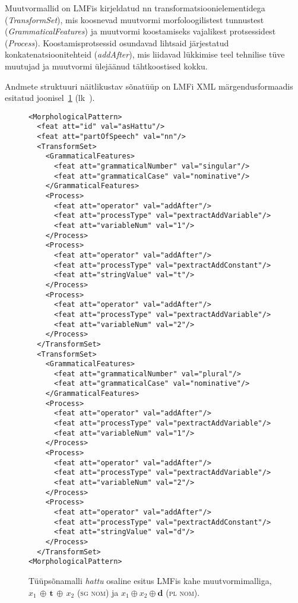 \documentclass[12pt,a4paper]{article}
\newcommand{\vadja}[1]{\textit{#1}}
\newcommand{\msd}[1]{\textsc{#1}}
\begin{document}
Muutvormallid on LMFis kirjeldatud nn transformatsiooni\-elementidega (\textit{TransformSet}), mis koosnevad muutvormi morfoloogilistest tunnustest (\textit{GrammaticalFeatures}) ja muutvormi koostamiseks vajalikest protsessidest (\textit{Process}). Koostamis\-protsessid osundavad lihtsaid järjestatud konkatenatsiooni\-tehteid (\textit{addAfter}), mis liidavad lükkimise teel tehnilise tüve muutujad ja muutvormi ülejäänud tähtkoostised kokku.

Andmete struktuuri näitlikustav sõnatüüp on LMFi XML märgendus\-formaadis esitatud joonisel~\ref{code:lmf-paradigmpattern} (lk~\pageref{code:lmf-paradigmpattern}).

\begin{figure}[h]
  \center
\begin{verbatim}
<MorphologicalPattern>
  <feat att="id" val="asHattu"/>
  <feat att="partOfSpeech" val="nn"/>
  <TransformSet>
    <GrammaticalFeatures>
      <feat att="grammaticalNumber" val="singular"/>
      <feat att="grammaticalCase" val="nominative"/>
    </GrammaticalFeatures>
    <Process>
      <feat att="operator" val="addAfter"/>
      <feat att="processType" val="pextractAddVariable"/>
      <feat att="variableNum" val="1"/>
    </Process>
    <Process>
      <feat att="operator" val="addAfter"/>
      <feat att="processType" val="pextractAddConstant"/>
      <feat att="stringValue" val="t"/>
    </Process>
    <Process>
      <feat att="operator" val="addAfter"/>
      <feat att="processType" val="pextractAddVariable"/>
      <feat att="variableNum" val="2"/>
    </Process>
  </TransformSet>
  <TransformSet>
    <GrammaticalFeatures>
      <feat att="grammaticalNumber" val="plural"/>
      <feat att="grammaticalCase" val="nominative"/>
    </GrammaticalFeatures>
    <Process>
      <feat att="operator" val="addAfter"/>
      <feat att="processType" val="pextractAddVariable"/>
      <feat att="variableNum" val="1"/>
    </Process>
    <Process>
      <feat att="operator" val="addAfter"/>
      <feat att="processType" val="pextractAddVariable"/>
      <feat att="variableNum" val="2"/>
    </Process>
    <Process>
      <feat att="operator" val="addAfter"/>
      <feat att="processType" val="pextractAddConstant"/>
      <feat att="stringValue" val="d"/>
    </Process>
  </TransformSet>
<MorphologicalPattern>
\end{verbatim}
\caption{Tüüpsõnamalli \vadja{hattu} osaline esitus LMF\-is kahe muutvormimalliga, $x_1\,\oplus\,\textbf{t}\,\oplus\,x_2$ (\msd{sg nom}) ja $x_1 \oplus x_2 \oplus \textbf{d}$ (\msd{pl nom}).
  \label{code:lmf-paradigmpattern}}
\end{figure}
\end{document}
